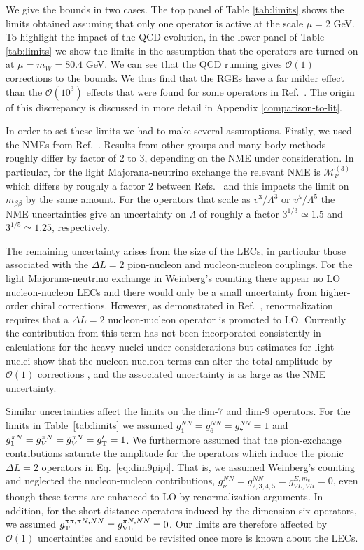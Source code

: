 \documentclass[letterpaper,11pt]{article}
\newcommand{\Or}{\mathcal O}
\newcommand{\textoverline}[1]{$\overline{\mbox{#1}}$}
\begin{document}
We give the bounds in two cases. The top panel of Table \ref{tab:limits} shows  the limits obtained assuming that only one operator is active at the scale $\mu = 2$ GeV.
To highlight the impact of the QCD evolution, in the lower panel of Table \ref{tab:limits} we show the limits in the assumption that the operators are turned on at $\mu = m_W = 80.4$ GeV.
We can see that the QCD running gives $\mathcal O(1)$ corrections to the bounds. We thus find that the RGEs have a far milder effect than the $\Or(10^3)$ effects that were found for some operators in Ref.\ \cite{Gonzalez:2015ady}. The origin of this discrepancy is discussed in more detail in Appendix \ref{comparison-to-lit}.

In order to set these limits we had to make several assumptions. 
Firstly, we used the NMEs from  Ref.~\cite{Menendez:2017fdf}. Results from other groups and many-body methods
roughly differ by factor of 2 to 3, depending on the NME under consideration. In particular, for the light Majorana-neutrino exchange the relevant NME is $\mathcal M_\nu^{(3)}$ which differs by roughly a factor 2 between Refs.~\cite{Hyvarinen:2015bda,Menendez:2017fdf,Barea:2015kwa,Horoi:2017gmj} and this impacts the limit on $m_{\beta\beta}$ by the same amount. For the operators that scale as $ v^3/\Lambda^3$ or $v^5/\Lambda^5$ the NME uncertainties give an uncertainty on $\Lambda$ of roughly a factor $3^{1/3}\simeq 1.5$ and $3^{1/5}\simeq1.25$, respectively. 

The remaining uncertainty arises from the size of the LECs, in particular those associated with the $\Delta L=2$ pion-nucleon and nucleon-nucleon couplings. For the light Majorana-neutrino exchange in Weinberg's counting there appear no LO nucleon-nucleon LECs and there would only be a small uncertainty from higher-order chiral corrections. However, as demonstrated in 
Ref.~\cite{Cirigliano:2018hja}, renormalization requires that a  $\Delta L=2$ nucleon-nucleon operator is promoted to LO. Currently the contribution from this term has not been incorporated consistently in calculations for the heavy nuclei under considerations but estimates for light nuclei show that the nucleon-nucleon terms can alter the total amplitude by $\mathcal O(1)$ corrections \cite{Cirigliano:2018hja}, and the associated uncertainty is as large as the NME uncertainty.

 Similar uncertainties affect the limits on the \textoverline{dim-7} and \textoverline{dim-9} operators. For the limits in Table~\ref{tab:limits} we assumed $g^{NN}_{1} = g^{NN}_{6} = g^{NN}_{7} =  1$ and $g^{\pi N}_{1} = g^{\pi N}_V = \tilde g^{\pi N}_{V} =  g_{\rm T}'=1$. We furthermore assumed that the pion-exchange contributions saturate the amplitude for the operators which induce the pionic $\Delta L=2$ operators in Eq.~\eqref{eq:dim9pipi}. That is, we assumed Weinberg's counting and neglected the nucleon-nucleon contributions, $g_\nu^{NN}=g^{NN}_{2,3,4,5}   = g_{VL,VR}^{E,m_e}=0$, even though these terms are enhanced to LO by renormalization arguments. In addition, for the short-distance operators induced by the dimension-six operators, we assumed $g_{\rm T}^{\pi\pi, \pi N,NN}=g_{\rm VL}^{\pi N,NN}=0$.
Our limits are therefore affected by $\mathcal O(1)$ uncertainties and should be revisited once more is known about the LECs. 
 
\end{document}
